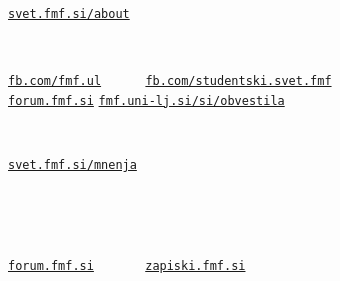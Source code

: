\documentclass[a4paper,oneside,12pt]{article}
\title{\Title}
\author{\Author}
\date{\today}
\theoremstyle{definition}
\newcommand{\veliko}[1]{\scalebox{4}{#1}}
\newcommand{\povezava}[1]{\begin{center}\vspace{-20pt}\Large
  \href{http://#1}{\texttt{#1}}\end{center}}
\begin{document}
\veliko{Ali veš, kaj dela} \\[1ex]
\hspace*{\fill} \veliko{študentski svet?}

\povezava{svet.fmf.si/about}

\veliko{Ali želiš biti obveščen tem} \\[1ex]
\hspace*{\fill} \veliko{kar se dogaja na faksu?}

\begin{center}
  \vspace{-20pt}
  \Large \href{http://fb.com/fmf.ul}{\texttt{fb.com/fmf.ul}}
  ~~~~~
  \Large \href{http://fb.com/studentski.svet.fmf}{\texttt{fb.com/studentski.svet.fmf}}
  ~~~~  \\
  \Large \href{http://forum.fmf.si}{\texttt{forum.fmf.si}} \hspace{36px}
  \Large \href{http://fmf.uni-lj.si/si/obvestila/}{\texttt{fmf.uni-lj.si/si/obvestila}}
  \hspace*{67px}
\end{center}

\veliko{Ali veš, kdo kandidira} \\[1ex]
\hspace*{\fill} \veliko{za izvolitev v naziv?}

\povezava{svet.fmf.si/mnenja}



\veliko{Ali veš kdaj konvergira}\\[-6ex]
\begin{center}
\end{center}
\vspace{-5ex}
\veliko{in s katerega kolokvija} \\
\hspace*{\fill} \veliko{je ta naloga?}

\begin{center}\vspace{-20pt}\Large
  \href{http://forum.fmf.si}{\texttt{forum.fmf.si}} ~~~~~~
  \href{http://zapiski.fmf.si}{\texttt{zapiski.fmf.si}}
\end{center}

\end{document}
